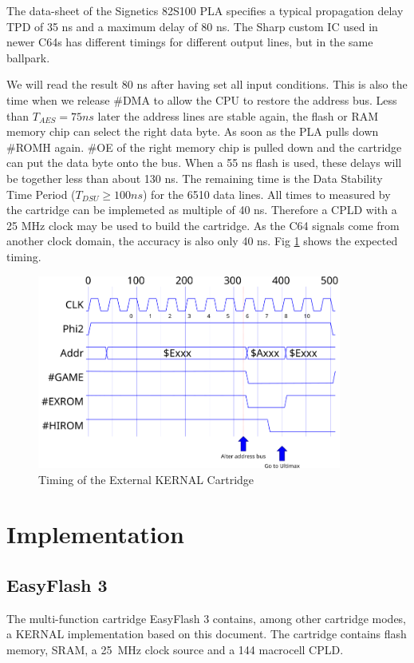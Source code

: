 \documentclass[a4paper]{memoir}
\begin{document}
The data-sheet of the Signetics 82S100 PLA specifies a typical
propagation delay TPD of 35 ns and a maximum delay of 80 ns. The
Sharp custom IC used in newer C64s has different timings for
different output lines, but in the same ballpark.

We will read the result 80 ns after having set all
input conditions. This is also the time when we release \#DMA to
allow the CPU to restore the address bus. Less than $T_{AES} = 75 ns$
later the address lines are stable again, the flash or RAM memory
chip can select the right data byte. As soon as the PLA pulls down
\#ROMH again. \#OE of the right memory chip is pulled down and the
cartridge can put the data byte onto the bus. When a 55 ns flash is
used, these delays will be together less than about 130 ns. The
remaining time is the Data Stability Time Period ($T_{DSU} \ge 100 ns$)
for the 6510 data lines. All times to measured by the cartridge can
be implemeted as multiple of 40 ns. Therefore a CPLD with a 25 MHz
clock may be used to build the cartridge. As the C64 signals come
from another clock domain, the accuracy is also only 40 ns. Fig
\ref {fig:timing} shows the expected timing.

\begin{figure}
    \centering
    \includegraphics[width=10cm]{src/implemented-timing}
    \caption{Timing of the External KERNAL Cartridge}
    \label{fig:timing}
\end{figure}

\chapter{Implementation}

\section{EasyFlash 3}

The multi-function cartridge EasyFlash 3 contains, among other 
cartridge modes, a KERNAL implementation based on this document. The
cartridge contains flash memory, SRAM, a 25~MHz clock source and a
144 macrocell CPLD.
\end{document}
